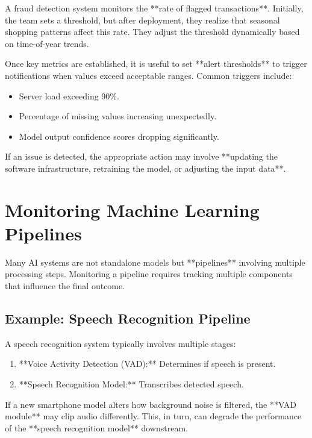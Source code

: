 \documentclass[12pt,openany]{book}
\begin{document}
\begin{examplebox}
   A fraud detection system monitors the **rate of flagged transactions**. Initially, the team sets a threshold, but after deployment, they realize that seasonal shopping patterns affect this rate. They adjust the threshold dynamically based on time-of-year trends.
\end{examplebox}

Once key metrics are established, it is useful to set **alert thresholds** to trigger notifications when values exceed acceptable ranges. Common triggers include:

\begin{itemize}
    \item Server load exceeding 90\%.
    \item Percentage of missing values increasing unexpectedly.
    \item Model output confidence scores dropping significantly.
\end{itemize}

If an issue is detected, the appropriate action may involve **updating the software infrastructure, retraining the model, or adjusting the input data**.

\section{Monitoring Machine Learning Pipelines}

Many AI systems are not standalone models but **pipelines** involving multiple processing steps. Monitoring a pipeline requires tracking multiple components that influence the final outcome.

\subsection{Example: Speech Recognition Pipeline}

A speech recognition system typically involves multiple stages:

\begin{enumerate}
    \item **Voice Activity Detection (VAD):** Determines if speech is present.
    \item **Speech Recognition Model:** Transcribes detected speech.
\end{enumerate}

\begin{examplebox}
   If a new smartphone model alters how background noise is filtered, the **VAD module** may clip audio differently. This, in turn, can degrade the performance of the **speech recognition model** downstream.
\end{examplebox}
\end{document}
